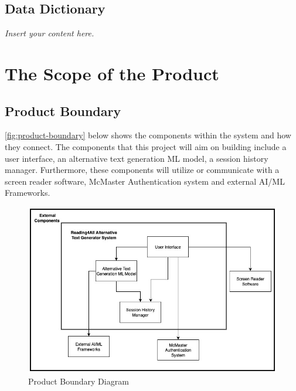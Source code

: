 \documentclass[12pt]{article}
\newcommand{\lips}{\textit{Insert your content here.}}
\begin{document}
\subsection{Data Dictionary}
\lips

\section{The Scope of the Product}
\subsection{Product Boundary}
\autoref{fig:product-boundary} below shows the components within the system and how they connect. The components that this project will aim on building include a user interface, an alternative text generation ML model, a session history manager. Furthermore, these components will utilize or communicate with a screen reader software, McMaster Authentication system and external AI/ML Frameworks. 
\label{tab:product-boundary} 
\begin{figure}[H]
    \centering
    \includegraphics[width=1.0\textwidth]{images/Product_Boundary_Diagram.jpg}
    \caption{Product Boundary Diagram}
    \label{fig:product-boundary}
\end{figure}
\end{document}
